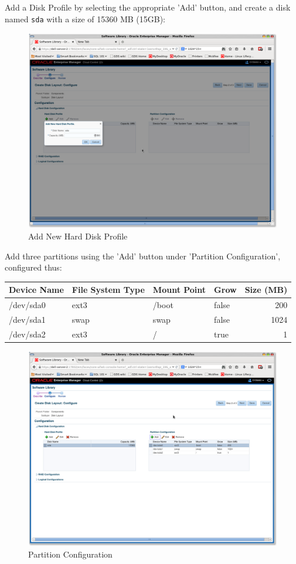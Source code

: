 \documentclass[11pt]{article}
\begin{document}
Add a Disk Profile by selecting the appropriate 'Add' button, and create a disk named \texttt{sda} with a size of 15360 MB (15GB):
\begin{figure}[htb]
\centering
\includegraphics[width=.9\linewidth]{./images/Add_New_Hard_Disk_Profile.png}
\caption{Add New Hard Disk Profile}
\end{figure}
\clearpage

Add three partitions using the 'Add' button under 'Partition Configuration', configured thus:

\begin{center}
\begin{tabular}{llllr}
Device Name & File System Type & Mount Point & Grow & Size (MB)\\
\hline
/dev/sda0 & ext3 & /boot & false & 200\\
/dev/sda1 & swap & swap & false & 1024\\
/dev/sda2 & ext3 & / & true & 1\\
\end{tabular}
\end{center}
\begin{figure}[htb]
\centering
\includegraphics[width=.9\linewidth]{./images/Partition_Configuration.png}
\caption{Partition Configuration}
\end{figure}
\clearpage
\end{document}
